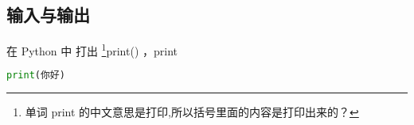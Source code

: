 


\subsection{输入与输出}

在 Python 中 打出 \footnote{单词 print 的中文意思是打印,所以括号里面的内容是打印出来的？}print() ，print 

\begin{lstlisting}[language=python]
print(你好)
\end{lstlisting}

